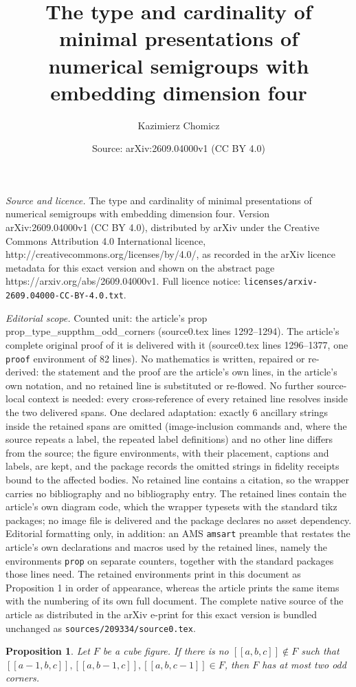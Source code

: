 \documentclass[10pt,a4paper]{amsart}
\title{The type and cardinality of minimal presentations of \\ numerical semigroups with embedding dimension four}
\author{Kazimierz Chomicz}
\date{Source: arXiv:2609.04000v1 (CC BY 4.0)}
\newtheorem{prop}{Proposition}
\begin{document}
\maketitle

\noindent\emph{Source and licence.} The type and cardinality of minimal presentations of \\ numerical semigroups with embedding dimension four. Version arXiv:2609.04000v1 (CC BY 4.0), distributed by arXiv under the Creative Commons Attribution 4.0 International licence, http://creativecommons.org/licenses/by/4.0/, as recorded in the arXiv licence metadata for this exact version and shown on the abstract page https://arxiv.org/abs/2609.04000v1. Full licence notice: \texttt{licenses/arxiv-2609.04000-CC-BY-4.0.txt}.\par\smallskip

\noindent\textit{Editorial scope.} Counted unit: the article's prop prop\_type\_suppthm\_odd\_corners (source0.tex lines 1292--1294). The article's complete original proof of it is delivered with it (source0.tex lines 1296--1377, one \texttt{proof} environment of 82 lines). No mathematics is written, repaired or re-derived: the statement and the proof are the article's own lines, in the article's own notation, and no retained line is substituted or re-flowed.  No further source-local context is needed: every cross-reference of every retained line resolves inside the two delivered spans.  One declared adaptation: exactly 6 ancillary strings inside the retained spans are omitted (image-inclusion commands and, where the source repeats a label, the repeated label definitions) and no other line differs from the source; the figure environments, with their placement, captions and labels, are kept, and the package records the omitted strings in fidelity receipts bound to the affected bodies.  No retained line contains a citation, so the wrapper carries no bibliography and no bibliography entry.  The retained lines contain the article's own diagram code, which the wrapper typesets with the standard tikz packages; no image file is delivered and the package declares no asset dependency.  Editorial formatting only, in addition: an AMS \texttt{amsart} preamble that restates the article's own declarations and macros used by the retained lines, namely the environments \texttt{prop} on separate counters, together with the standard packages those lines need.  The retained environments print in this document as Proposition 1 in order of appearance, whereas the article prints the same items with the numbering of its own full document.  The complete native source of the article as distributed in the arXiv e-print for this exact version is bundled unchanged as \texttt{sources/209334/source0.tex}.
\begin{prop}\label{prop_type_suppthm_odd_corners}
    Let $F$ be a cube figure. If there is no $[[a,b,c]] \notin F$ such that $[[a-1,b,c]],[[a,b-1,c]],[[a,b,c-1]] \in F$, then $F$ has at most two odd corners.
\end{prop}
\end{document}

